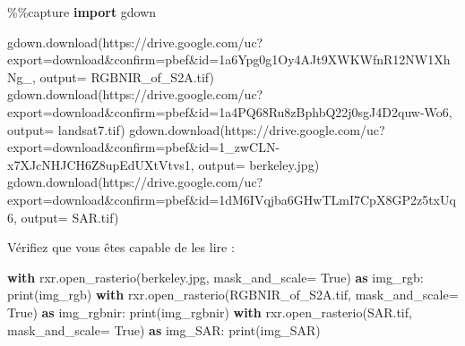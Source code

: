 \documentclass[
]{article}
\newenvironment{Shaded}{}{}
\newcommand{\BuiltInTok}[1]{\textcolor[rgb]{0.00,0.50,0.00}{#1}}
\newcommand{\ControlFlowTok}[1]{\textcolor[rgb]{0.00,0.44,0.13}{\textbf{#1}}}
\newcommand{\ImportTok}[1]{\textcolor[rgb]{0.00,0.50,0.00}{\textbf{#1}}}
\newcommand{\NormalTok}[1]{#1}
\newcommand{\OperatorTok}[1]{\textcolor[rgb]{0.40,0.40,0.40}{#1}}
\newcommand{\StringTok}[1]{\textcolor[rgb]{0.25,0.44,0.63}{#1}}
\newcommand{\VariableTok}[1]{\textcolor[rgb]{0.10,0.09,0.49}{#1}}
\begin{document}
\label{b2dbf610}
\label{cb3}
\begin{Shaded}
\begin{Highlighting}[]
\OperatorTok{\%\%}\NormalTok{capture}
\ImportTok{import}\NormalTok{ gdown}

\NormalTok{gdown.download(}\StringTok{\textquotesingle{}https://drive.google.com/uc?export=download\&confirm=pbef\&id=1a6Ypg0g1Oy4AJt9XWKWfnR12NW1XhNg\_\textquotesingle{}}\NormalTok{, output}\OperatorTok{=} \StringTok{\textquotesingle{}RGBNIR\_of\_S2A.tif\textquotesingle{}}\NormalTok{)}
\NormalTok{gdown.download(}\StringTok{\textquotesingle{}https://drive.google.com/uc?export=download\&confirm=pbef\&id=1a4PQ68Ru8zBphbQ22j0sgJ4D2quw{-}Wo6\textquotesingle{}}\NormalTok{, output}\OperatorTok{=} \StringTok{\textquotesingle{}landsat7.tif\textquotesingle{}}\NormalTok{)}
\NormalTok{gdown.download(}\StringTok{\textquotesingle{}https://drive.google.com/uc?export=download\&confirm=pbef\&id=1\_zwCLN{-}x7XJcNHJCH6Z8upEdUXtVtvs1\textquotesingle{}}\NormalTok{, output}\OperatorTok{=} \StringTok{\textquotesingle{}berkeley.jpg\textquotesingle{}}\NormalTok{)}
\NormalTok{gdown.download(}\StringTok{\textquotesingle{}https://drive.google.com/uc?export=download\&confirm=pbef\&id=1dM6IVqjba6GHwTLmI7CpX8GP2z5txUq6\textquotesingle{}}\NormalTok{, output}\OperatorTok{=} \StringTok{\textquotesingle{}SAR.tif\textquotesingle{}}\NormalTok{)}
\end{Highlighting}
\end{Shaded}

Vérifiez que vous êtes capable de les lire :

\label{816cbcdd}
\label{cb4}
\begin{Shaded}
\begin{Highlighting}[]
\ControlFlowTok{with}\NormalTok{ rxr.open\_rasterio(}\StringTok{\textquotesingle{}berkeley.jpg\textquotesingle{}}\NormalTok{, mask\_and\_scale}\OperatorTok{=} \VariableTok{True}\NormalTok{) }\ImportTok{as}\NormalTok{ img\_rgb:}
    \BuiltInTok{print}\NormalTok{(img\_rgb)}
\ControlFlowTok{with}\NormalTok{ rxr.open\_rasterio(}\StringTok{\textquotesingle{}RGBNIR\_of\_S2A.tif\textquotesingle{}}\NormalTok{, mask\_and\_scale}\OperatorTok{=} \VariableTok{True}\NormalTok{) }\ImportTok{as}\NormalTok{ img\_rgbnir:}
    \BuiltInTok{print}\NormalTok{(img\_rgbnir)}
\ControlFlowTok{with}\NormalTok{ rxr.open\_rasterio(}\StringTok{\textquotesingle{}SAR.tif\textquotesingle{}}\NormalTok{, mask\_and\_scale}\OperatorTok{=} \VariableTok{True}\NormalTok{) }\ImportTok{as}\NormalTok{ img\_SAR:}
    \BuiltInTok{print}\NormalTok{(img\_SAR)}
\end{Highlighting}
\end{Shaded}
\end{document}
